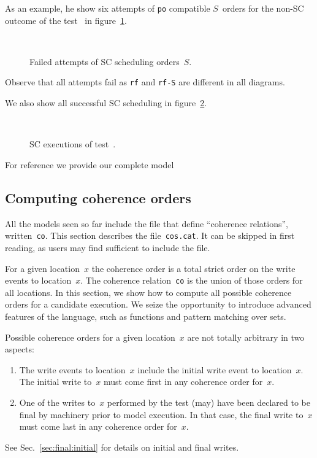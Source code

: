 As an example, he show six attempts of \texttt{po} compatible $S$~orders
for the non-SC outcome of the test~ in figure~\ref{sblamport}.
\begin{figure}[htp]
\caption{\label{sblamport}Failed attempts of SC scheduling orders~$S$.}
\begin{center}
\quad{}\quad{}\\
\quad{}\quad{}
\end{center}
\end{figure}
Observe that all attempts fail as \texttt{rf} and \texttt{rf-S}
are different in all diagrams.

We also show all successful SC scheduling in figure~\ref{sbok}.
\begin{figure}[htp]
\caption{\label{sbok}SC executions of test~.}
\begin{center}
\quad{}\quad{}\\
\quad{}\quad{}
\end{center}
\end{figure}


For reference we provide our complete model~


\subsection{Computing \label{sec:cos}coherence orders}
All the models seen so far include the file  that define
``coherence relations'', written~\texttt{co}.
This section describes the file~\texttt{cos.cat}.
It can be skipped in first reading, as users may find sufficient
to include the file.

For a given location~$x$ the coherence order is a total strict order on the
write events to location~$x$. The coherence relation~\texttt{co} is the union
of those orders for all locations.
In this section, we show how to compute all possible coherence orders for
a candidate execution.
We seize the opportunity to introduce advanced features of the \cat{}
language, such as functions and pattern matching over sets.

Possible coherence orders for a given location~$x$
are not totally arbitrary in two aspects:
\begin{enumerate}
\item The write events to location~$x$ include
the initial write event to location~$x$.  The initial write to~$x$ must come
first in any coherence order for~$x$.
\item One of the writes to~$x$ performed by the test (may) have been declared
to be final by \herd{} machinery prior to model execution.
In that case, the final write to~$x$ must come last in any coherence order
for~$x$.
\end{enumerate}
See Sec.~\ref{sec:final:initial} for details on initial and final writes.

